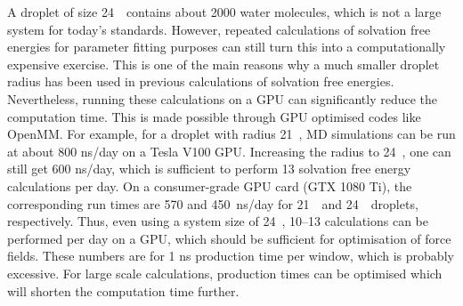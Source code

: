 \begin{table}[b!]
\caption{Same as  but as a function of the ion 
         off-centre positions along the $z$-axis with a droplet 
         size of $R=24$~\angs.} 
\label{solv:tab4}
\end{table}

A droplet of size 24~\angs\ contains about 2000 water molecules, which is not a large system for today's 
standards. However, repeated calculations of solvation free energies for parameter fitting purposes can 
still turn this into a computationally expensive exercise. This is one of the main reasons why a much 
smaller droplet radius has been used in previous calculations of solvation free energies. Nevertheless, 
running these calculations on a GPU can significantly reduce the computation time. This is made possible 
through GPU optimised codes like OpenMM. For example, for a droplet with radius 21~\angs, MD simulations 
can be run at about 800 ns/day on a Tesla V100 GPU. Increasing the radius to 24~\angs, one can still get 
600 ns/day, which is sufficient to perform 13 solvation free energy calculations per day. On a consumer-grade 
GPU card (GTX 1080 Ti), the corresponding run times are 570 and 450~ns/day for 21~\angs\ and 
24~\angs\ droplets, respectively. Thus, even using a system size of 24~\angs, 10--13 calculations can be 
performed per day on a GPU, which should be sufficient for optimisation of force fields. These numbers 
are for 1 ns production time per window, which is probably excessive. For large scale calculations, 
production times can be optimised which will shorten the computation time further.

